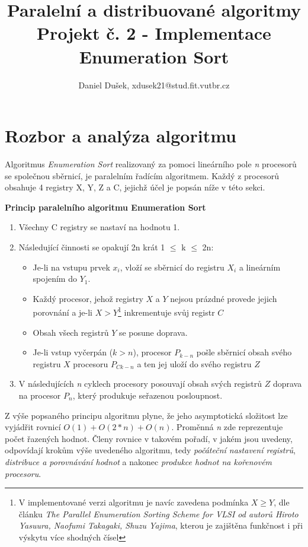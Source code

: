 \documentclass[a4paper,10pt]{article}
\title{Paralelní a distribuované algoritmy \\Projekt č. 2 \-- Implementace Enumeration Sort}
\author{Daniel Dušek, xdusek21@stud.fit.vutbr.cz}
\newcommand{\Omicron}{O}
\begin{document}
    \maketitle

	\section{Rozbor a analýza algoritmu}
    	\par Algoritmus \textit{Enumeration Sort} realizovaný za pomoci lineárního pole \textit{n} procesorů se společnou sběrnicí, je paralelním řadícím algoritmem. Každý z procesorů obsahuje  4 registry X, Y, Z a C, jejichž účel je popsán níže v této sekci. 

    	\hspace{0.2cm}

    	\textbf{Princip paralelního algoritmu Enumeration Sort}

    	\begin{enumerate}
    		\item Všechny C registry se nastaví na hodnotu 1.
    		\item Následující činnosti se opakují 2n krát 1 $\leq $ k $\leq$ 2n:
    			\begin{itemize}
    				\item{Je-li na vstupu prvek $x_i$, vloží se sběrnicí do registru $X_i$ a lineárním spojením do $Y_1$.}
    				\item{Každý procesor, jehož registry $X$ a $Y$ nejsou prázdné provede jejich porovnání a je-li $X>Y$\footnote{V implementované verzi algoritmu je navíc zavedena podmínka $X \geq Y$, dle článku \textit{The Parallel Enumeration Sorting Scheme for VLSI od autorů Hiroto Yasuura, Naofumi Takagaki, Shuzu Yajima}, kterou je zajištěna funkčnost i při výskytu více shodných čísel} inkrementuje svůj registr $C$}
    				\item{Obsah všech registrů $Y$ se posune doprava.}
    				\item{Je-li vstup vyčerpán ($k>n$), procesor $P_{k-n}$ pošle sběrnicí obsah svého registru $X$ procesoru $P_{Ck-n}$ a ten jej uloží do svého registru $Z$ }
    			\end{itemize}
    		\item V následujících \textit{n} cyklech procesory posouvají obsah svých registrů $Z$ doprava na procesor $P_n$, který produkuje seřazenou posloupnost.
    	\end{enumerate}

    	\par Z výše popsaného principu algoritmu plyne, že jeho asymptotická složitost lze vyjádřit rovnicí $\Omicron \left(1\right) + \Omicron \left(2*n\right) + \Omicron \left(n\right)$. Proměnná \textit{n} zde reprezentuje počet řazených hodnot. Členy rovnice v takovém pořadí, v jakém jsou uvedeny, odpovídají krokům výše uvedeného algoritmu, tedy \textit{počáteční nastavení registrů}, \textit{distribuce a porovnávání hodnot} a nakonec \textit{produkce hodnot na kořenovém procesoru}.
\end{document}
